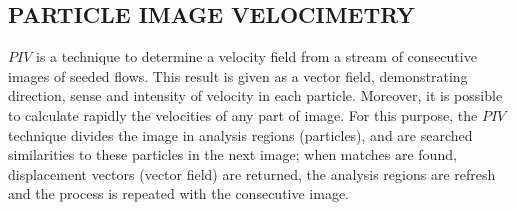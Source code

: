 
\subsection{PARTICLE IMAGE VELOCIMETRY}

$PIV$ is a technique to determine a velocity field from a stream of consecutive 
images of seeded flows\cite{Bastiaans}.
This result is given as a vector field, demonstrating direction, sense and 
intensity of velocity in each particle. 
Moreover, it is possible to calculate rapidly the velocities of any part of image.
For this purpose, the $PIV$ technique divides the image in analysis regions (particles), 
and are searched similarities to these particles in the next image; 
when matches are found, displacement vectors (vector field) are returned,
the analysis regions are refresh and the process is repeated with the consecutive image.
